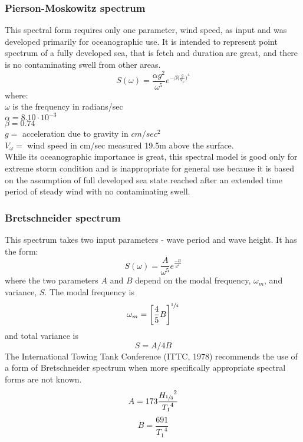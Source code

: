 \subsubsection{Pierson-Moskowitz spectrum}
This spectral form requires only one parameter, wind speed, as input and was
developed primarily for oceanographic use. It is intended to represent point
spectrum of a fully developed sea, that is fetch and duration are great, and
there is no contaminating swell from other areas. 
\begin{equation}
  S(\omega) = \frac{\alpha g^2}{\omega^5} 
    e^{ -\beta \big(\frac{g}{V_{\omega}} \big)^4 }
  \label {eq: pierson moskowitz spectrum}
\end{equation}
where:\\
$\omega$ is the frequency in radians/sec\\
$\alpha = 8.10 \cdot 10^{-3}$\\
$\beta = 0.74$ \\
$g =$ acceleration due to gravity in $cm/sec^2$\\
$V_{\omega} =$ wind speed in cm/sec measured 19.5m above the surface.\\

While its oceanographic importance is great, this spectral model is good only
for extreme storm condition and is inappropriate for general use because it is
based on the assumption of full developed sea state reached after an extended
time period of steady wind with no contaminating swell. 

\subsubsection{Bretschneider spectrum}
This spectrum takes two input parameters - wave period and wave height. It has
the form:
\begin{equation}
  S(\omega) = \frac{A}{\omega^5} e^{\frac{-B}{\omega^4}}
  \label {eq: bretschneider spectrum}
\end{equation}
where the two parameters $A$ and $B$ depend on the modal frequency, $\omega_m$,
and variance, $S$. The modal frequency is
\begin{equation}
  \omega_m = \bigg[\frac{4}{5}B \bigg]^{\sfrac{1}{4}}
\end{equation}
and total variance is 
\begin{equation}
  S = A/4B
\end{equation}
The International Towing Tank Conference (ITTC, 1978) recommends the use of a
form of Bretschneider spectrum when more specifically appropriate spectral forms
are not known. 
\begin{equation}
  A = 173 \frac{{H_{\sfrac{1}{3}}}^2 }{{T_1}^4}
\end{equation}
\begin{equation}
  B = \frac{691}{{T_1}^4} 
\end{equation}

